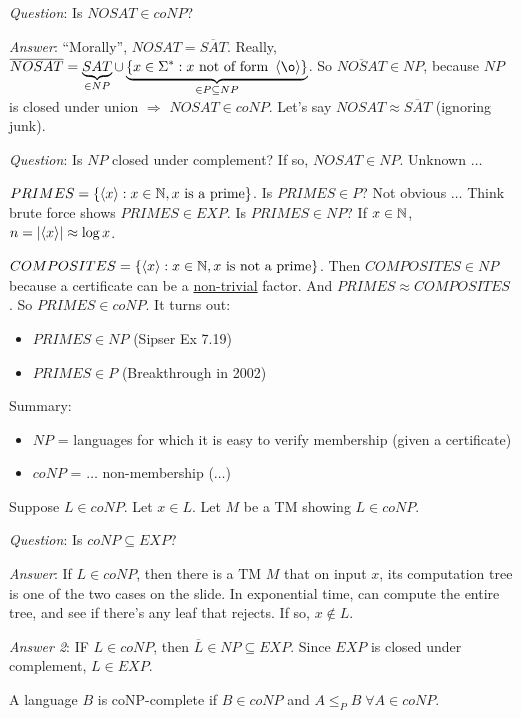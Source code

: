 \emph{Question}: Is $NOSAT \in coNP$?

\emph{Answer}: ``Morally'', $NOSAT = \overline{SAT}$. Really, $\overline{NOSAT} = \underbrace{SAT}_{\in NP} \cup \underbrace{\set{x \in \Sigma^* : x \text{ not of form } \encoding{\o}}}_{\in P \subseteq NP}$. So $\overline{NOSAT} \in NP$, because $NP$ is closed under union $\Rightarrow$ $NOSAT \in coNP$. Let's say $NOSAT \approx \overline{SAT}$ (ignoring junk).

\emph{Question}: Is $NP$ closed under complement? If so, $NOSAT \in NP$. Unknown $\ldots$

$PRIMES = \left \{ \left \langle x \right \rangle : x \in \mathbb{N}, x \text{ is a prime} \right \}$. Is $PRIMES \in P$? Not obvious $\ldots$ Think brute force shows $PRIMES \in EXP$. Is $PRIMES \in NP$? If $x \in \mathbb{N}$, $n = \left | \left \langle x \right \rangle \right | \approx \log{x}$.

$COMPOSITES = \left \{ \left \langle x \right \rangle : x \in \mathbb{N}, x \text{ is not a prime} \right \}$. Then $COMPOSITES \in NP$ because a certificate can be a \underline{non-trivial} factor. And $PRIMES \approx COMPOSITES$. So $PRIMES \in coNP$. It turns out:

\begin{itemize}
    \item $PRIMES \in NP$ (Sipser Ex 7.19)
    \item $PRIMES \in P$ (Breakthrough in 2002)
\end{itemize}

Summary:

\begin{itemize}
    \item $NP$ = languages for which it is easy to verify membership (given a certificate)
    \item $coNP$ = $\ldots$ non-membership ($\ldots$)
\end{itemize}

Suppose $L \in coNP$. Let $x \in L$. Let $M$ be a TM showing $L \in coNP$.

\emph{Question}: Is $coNP \subseteq EXP$?

\emph{Answer}: If $L \in coNP$, then there is a TM $M$ that on input $x$, its computation tree is one of the two cases on the slide. In exponential time, can compute the entire tree, and see if there's any leaf that rejects. If so, $x \notin L$.

\emph{Answer 2}: IF $L \in coNP$, then $\overline{L} \in NP \subseteq EXP$. Since $EXP$ is closed under complement, $L \in EXP$.

\begin{definition}
    A language $B$ is coNP-complete if $B \in coNP$ and $A \leq_{P} B \; \forall A \in coNP$.
\end{definition}

